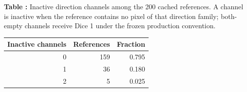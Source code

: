 \begin{center}
\noindent\textbf{Table \thetable:} Inactive direction channels among the 200
cached references. A channel is inactive when the reference contains no pixel
of that direction family; both-empty channels receive Dice 1 under the frozen
production convention.\par
\label{tab:inactive}
\vspace{0.5em}
\begin{tabular}{rrr}
\toprule
Inactive channels & References & Fraction \\
\midrule
0 & 159 & 0.795 \\
1 & 36 & 0.180 \\
2 & 5 & 0.025 \\
\bottomrule
\end{tabular}
\end{center}
